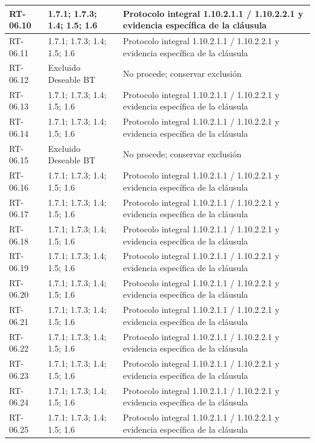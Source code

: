 \begin{longtable}{L{23mm}L{46mm}L{72mm}}
RT-06.10 & 1.7.1; 1.7.3; 1.4; 1.5; 1.6 & Protocolo integral 1.10.2.1.1 / 1.10.2.2.1 y evidencia específica de la cláusula\\\hline
RT-06.11 & 1.7.1; 1.7.3; 1.4; 1.5; 1.6 & Protocolo integral 1.10.2.1.1 / 1.10.2.2.1 y evidencia específica de la cláusula\\\hline
RT-06.12 & Excluido Deseable BT & No procede; conservar exclusión\\\hline
RT-06.13 & 1.7.1; 1.7.3; 1.4; 1.5; 1.6 & Protocolo integral 1.10.2.1.1 / 1.10.2.2.1 y evidencia específica de la cláusula\\\hline
RT-06.14 & 1.7.1; 1.7.3; 1.4; 1.5; 1.6 & Protocolo integral 1.10.2.1.1 / 1.10.2.2.1 y evidencia específica de la cláusula\\\hline
RT-06.15 & Excluido Deseable BT & No procede; conservar exclusión\\\hline
RT-06.16 & 1.7.1; 1.7.3; 1.4; 1.5; 1.6 & Protocolo integral 1.10.2.1.1 / 1.10.2.2.1 y evidencia específica de la cláusula\\\hline
RT-06.17 & 1.7.1; 1.7.3; 1.4; 1.5; 1.6 & Protocolo integral 1.10.2.1.1 / 1.10.2.2.1 y evidencia específica de la cláusula\\\hline
RT-06.18 & 1.7.1; 1.7.3; 1.4; 1.5; 1.6 & Protocolo integral 1.10.2.1.1 / 1.10.2.2.1 y evidencia específica de la cláusula\\\hline
RT-06.19 & 1.7.1; 1.7.3; 1.4; 1.5; 1.6 & Protocolo integral 1.10.2.1.1 / 1.10.2.2.1 y evidencia específica de la cláusula\\\hline
RT-06.20 & 1.7.1; 1.7.3; 1.4; 1.5; 1.6 & Protocolo integral 1.10.2.1.1 / 1.10.2.2.1 y evidencia específica de la cláusula\\\hline
RT-06.21 & 1.7.1; 1.7.3; 1.4; 1.5; 1.6 & Protocolo integral 1.10.2.1.1 / 1.10.2.2.1 y evidencia específica de la cláusula\\\hline
RT-06.22 & 1.7.1; 1.7.3; 1.4; 1.5; 1.6 & Protocolo integral 1.10.2.1.1 / 1.10.2.2.1 y evidencia específica de la cláusula\\\hline
RT-06.23 & 1.7.1; 1.7.3; 1.4; 1.5; 1.6 & Protocolo integral 1.10.2.1.1 / 1.10.2.2.1 y evidencia específica de la cláusula\\\hline
RT-06.24 & 1.7.1; 1.7.3; 1.4; 1.5; 1.6 & Protocolo integral 1.10.2.1.1 / 1.10.2.2.1 y evidencia específica de la cláusula\\\hline
RT-06.25 & 1.7.1; 1.7.3; 1.4; 1.5; 1.6 & Protocolo integral 1.10.2.1.1 / 1.10.2.2.1 y evidencia específica de la cláusula\\\hline

\end{longtable}
